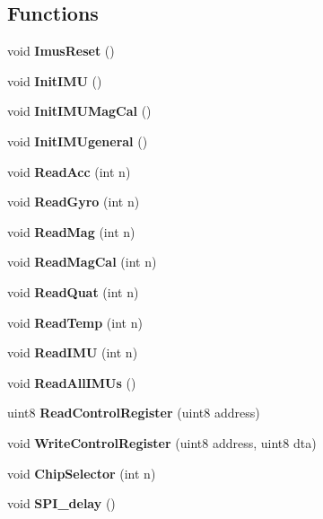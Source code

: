 \subsection*{Functions}
\begin{DoxyCompactItemize}
\item 
\mbox{\label{_i_m_u__functions_8h_a950a5a57e4188823c580d054ed2db16a}} 
void {\bfseries Imus\+Reset} ()
\item 
\mbox{\label{_i_m_u__functions_8h_ac4f81f61837e6a132dfceb5bb93b06fa}} 
void {\bfseries Init\+I\+MU} ()
\item 
\mbox{\label{_i_m_u__functions_8h_ac95975151b543b5265bc1e470aabf465}} 
void {\bfseries Init\+I\+M\+U\+Mag\+Cal} ()
\item 
\mbox{\label{_i_m_u__functions_8h_a83f0630cb5ff556322c8cf56b6c6afc0}} 
void {\bfseries Init\+I\+M\+Ugeneral} ()
\item 
\mbox{\label{_i_m_u__functions_8h_a0290185f5b71ddb96ea13ce0a1ff48e7}} 
void {\bfseries Read\+Acc} (int n)
\item 
\mbox{\label{_i_m_u__functions_8h_ab8ae2a28912ce4a548b3603e86b22ae9}} 
void {\bfseries Read\+Gyro} (int n)
\item 
\mbox{\label{_i_m_u__functions_8h_a2ee29250f51422fa3d76df77335cce26}} 
void {\bfseries Read\+Mag} (int n)
\item 
\mbox{\label{_i_m_u__functions_8h_aad3b4856a76c623025484fe5b931bdd4}} 
void {\bfseries Read\+Mag\+Cal} (int n)
\item 
\mbox{\label{_i_m_u__functions_8h_a8eeecefb2efe7e01711fb9448c31ae76}} 
void {\bfseries Read\+Quat} (int n)
\item 
\mbox{\label{_i_m_u__functions_8h_ab0883cd12ebf2937fd6da478ac3ab976}} 
void {\bfseries Read\+Temp} (int n)
\item 
\mbox{\label{_i_m_u__functions_8h_a45df9ddb73de250cebfa02bf1d72bd97}} 
void {\bfseries Read\+I\+MU} (int n)
\item 
\mbox{\label{_i_m_u__functions_8h_a27bf3026dfe4cb0d6d255decc9944d71}} 
void {\bfseries Read\+All\+I\+M\+Us} ()
\item 
\mbox{\label{_i_m_u__functions_8h_a209b21711f8765bb41e1823aab7b995b}} 
uint8 {\bfseries Read\+Control\+Register} (uint8 address)
\item 
\mbox{\label{_i_m_u__functions_8h_af429837786eebd63058e26b3c86ac17a}} 
void {\bfseries Write\+Control\+Register} (uint8 address, uint8 dta)
\item 
\mbox{\label{_i_m_u__functions_8h_a3bb201c102e53b1b56398272fa105fbb}} 
void {\bfseries Chip\+Selector} (int n)
\item 
\mbox{\label{_i_m_u__functions_8h_a26f85d9c393e73879461861d2ac87379}} 
void {\bfseries S\+P\+I\+\_\+delay} ()
\end{DoxyCompactItemize}


